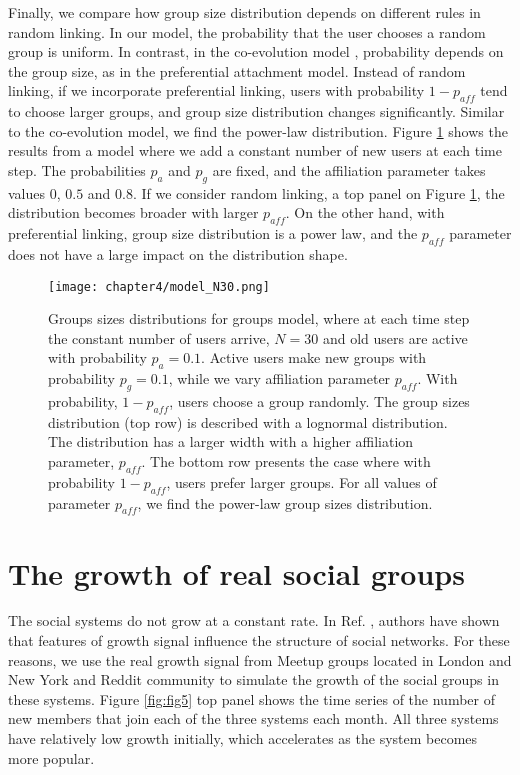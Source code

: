 Finally, we compare how group size distribution depends on different rules in random linking. In our model, the probability that the user chooses a random group is uniform. In contrast, in the co-evolution model \cite{zheleva2009co}, probability depends on the group size, as in the preferential attachment model. Instead of random linking, if we incorporate preferential linking, users with probability $1-p_{aff}$ tend to choose larger groups, and group size distribution changes significantly. Similar to the co-evolution model, we find the power-law distribution. Figure \ref{fig:model_comp} shows the results from a model where we add a constant number of new users at each time step. The probabilities $p_a$ and $p_g$ are fixed, and the affiliation parameter takes values $0$, $0.5$ and $0.8$. If we consider random linking, a top panel on Figure \ref{fig:model_comp}, the distribution becomes broader with larger $p_{aff}$. On the other hand, with preferential linking, group size distribution is a power law, and the $p_{aff}$ parameter does not have a large impact on the distribution shape.    

\begin{figure}[h]
	\centering
	\texttt{[image: chapter4/model\_N30.png]}
	\caption[Comparison between preferential and random linking in the groups' growth model.]{Groups sizes distributions for groups model, where at each time step the constant number of users arrive, $N=30$ and old users are active with probability $p_a=0.1$. Active users make new groups with probability $p_g=0.1$, while we vary affiliation parameter $p_{aff}$. With probability, $1-p_{aff}$, users choose a group randomly. The group sizes distribution (top row) is described with a lognormal distribution. The distribution has a larger width with a higher affiliation parameter, $p_{aff}$. The bottom row presents the case where with probability $1-p_{aff}$, users prefer larger groups. For all values of parameter $p_{aff}$, we find the power-law group sizes distribution.}
	\label{fig:model_comp}
\end{figure}

\newpage
\section{The growth of real social groups} %

The social systems do not grow at a constant rate. In Ref. \cite{vranic2021growth}, authors have shown that features of growth signal influence the structure of social networks. For these reasons, we use the real growth signal from Meetup groups located in London and New York and Reddit community to simulate the growth of the social groups in these systems. Figure \ref{fig:fig5} top panel shows the time series of the number of new members that join each of the three systems each month. All three systems have relatively low growth initially, which accelerates as the system becomes more popular.

